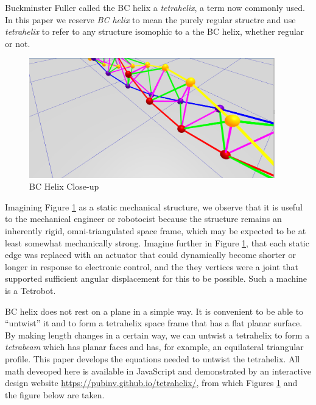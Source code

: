 \documentclass[11pt]{article}
\begin{document}
Buckminster Fuller called the BC helix a \emph{tetrahelix}\cite{fuller1982synergetics},
a term now commonly used. In this paper we reserve \emph{BC helix} to mean the purely regular structre and use \emph{tetrahelix} to refer
to any structure isomophic to a the BC helix, whether regular or not.



\begin{figure}[H]
  \label{fig:closeup}
  \centering
     \includegraphics[width=0.95\textwidth]{figures/BCHelixCloseUp.png}
     \caption{BC Helix Close-up}
\end{figure}


Imagining Figure \ref{fig:closeup} as a static mechanical structure,
we observe that it is useful to the mechanical engineer or
robotocist because the structure remains an inherently rigid,
omni-triangulated space frame, which may be expected to be at least
somewhat mechanically strong.
Imagine further in Figure \ref{fig:closeup}, that each static edge was replaced with an
actuator that could dynamically become shorter or longer in response to electronic control,
and the they vertices were a joint that supported sufficient angular displacement
for this to be possible. Such a machine is a Tetrobot\cite{TetrobotBook}.

BC helix does not rest on a plane in a simple way. It is convenient to
be able to ``untwist'' it and to form a tetrahelix space frame that has a
flat planar surface. By making length changes in a certain way, we can
untwist a tetrahelix to form a \emph{tetrabeam} which has planar faces
and has, for example, an equilateral triangular profile. This paper
develops the equations needed to untwist the tetrahelix. All math
deveoped here is available in JavaScript and demonstrated by an interactive
design website \url{https://pubinv.github.io/tetrahelix/}\cite{readtetrahelix},
from which Figures \ref{fig:closeup} and
the figure below are taken.
\end{document}
